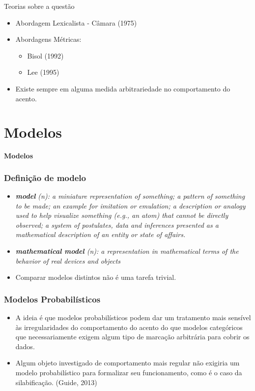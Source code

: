 \documentclass[xcolor=table]{beamer}
\begin{document}
	\begin{frame}{Teorias sobre a questão}
		\begin{itemize}
			\item Abordagem Lexicalista - Câmara (1975)\\
			\item Abordagens Métricas:
			\begin{itemize}
				\item Bisol (1992)\\
				\item Lee (1995)\\
			\end{itemize}
			\item Existe sempre em alguma medida arbitrariedade no comportamento do acento.\\
		\end{itemize}		
	\end{frame}
\section{Modelos}
		\begin{frame}
			\centering	
			\textbf{Modelos}
		\end{frame}
	\begin{frame}
		\frametitle{Definição de modelo}
		\begin{itemize}
			\item \textit{\textbf{model} (n): a miniature representation of something; a pattern of something
			to be made; an example for imitation or emulation; a description or
			analogy used to help visualize something (e.g., an atom) that cannot be directly
			observed; a system of postulates, data and inferences presented as a
			mathematical description of an entity or state of affairs.}\\
			\item \textit{\textbf{mathematical model} (n): a representation in mathematical terms of the behavior of real devices and objects}\\
			\item Comparar modelos distintos não é uma tarefa trivial.\\
			\end{itemize}
	\end{frame}

	\begin{frame}
		\frametitle{Modelos Probabilísticos}
		\begin{itemize}
		\item A ideia é que modelos probabilísticos podem dar um tratamento mais sensível às irregularidades do comportamento do acento do que modelos categóricos que necessariamente exigem algum tipo de marcação arbitrária para cobrir os dados.\\
		\item Algum objeto investigado de comportamento mais regular não exigiria um modelo probabilístico para formalizar seu funcionamento, como é o caso da silabificação. (Guide, 2013)
		\end{itemize}
	\end{frame}
\end{document}
